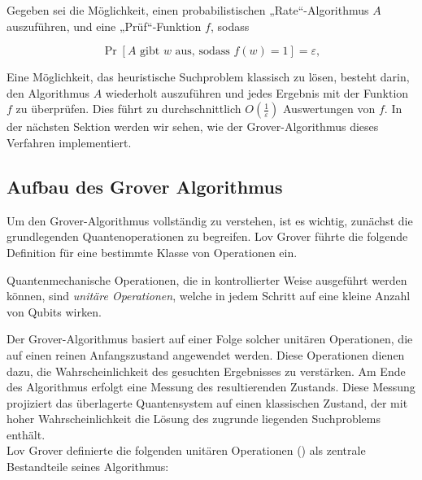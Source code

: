 \begin{definition}
Gegeben sei die Möglichkeit, einen probabilistischen „Rate“-Algorithmus \( A \) auszuführen, und eine „Prüf“-Funktion \( f \), sodass

\[
\Pr\left[ A \text{ gibt } w \text{ aus, sodass } f(w) = 1 \right] = \varepsilon,
\]
\end{definition}

Eine Möglichkeit, das heuristische Suchproblem klassisch zu lösen, besteht darin, den Algorithmus \( A \) wiederholt auszuführen und jedes Ergebnis mit der Funktion \( f \) zu überprüfen. Dies führt zu durchschnittlich \( O\left(\frac{1}{\varepsilon}\right) \) Auswertungen von \( f \). In der nächsten Sektion werden wir sehen, wie der Grover-Algorithmus dieses Verfahren implementiert.

\subsection{Aufbau des Grover Algorithmus}

Um den Grover-Algorithmus vollständig zu verstehen, ist es wichtig, zunächst die grundlegenden Quantenoperationen zu begreifen. Lov Grover führte die folgende Definition für eine bestimmte Klasse von Operationen ein.\cite[1-2]{zotero-1211}

\begin{definition}
Quantenmechanische Operationen, die in kontrollierter Weise ausgeführt werden können, sind \emph{unitäre Operationen}, welche in jedem Schritt auf eine kleine Anzahl von Qubits wirken.
\end{definition}

Der Grover-Algorithmus basiert auf einer Folge solcher unitären Operationen, die auf einen reinen Anfangszustand angewendet werden. Diese Operationen dienen dazu, die Wahrscheinlichkeit des gesuchten Ergebnisses zu verstärken. Am Ende des Algorithmus erfolgt eine Messung des resultierenden Zustands. Diese Messung projiziert das überlagerte Quantensystem auf einen klassischen Zustand, der mit hoher Wahrscheinlichkeit die Lösung des zugrunde liegenden Suchproblems enthält.\\

Lov Grover definierte die folgenden unitären Operationen (\cite{zotero-1211}) als zentrale Bestandteile seines Algorithmus:

